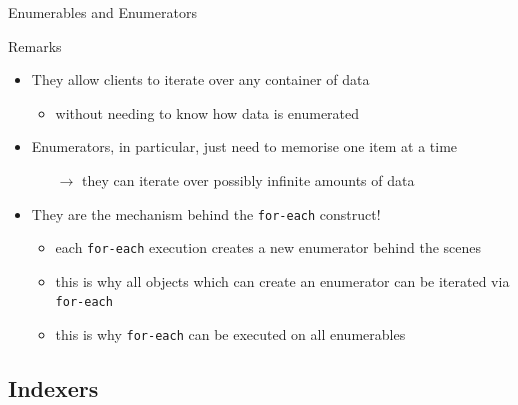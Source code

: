 \documentclass[presentation]{beamer}
\begin{document}
\begin{frame}{Enumerables and Enumerators}
  \begin{exampleblock}{Remarks}
    \begin{itemize}
      \item They allow clients to iterate over any container of data
      \begin{itemize}
        \item without needing to know \alert{how} data is enumerated
      \end{itemize}
  
      \item Enumerators, in particular, just need to memorise one item at a time
      \begin{itemize}
        \item[$\rightarrow$] they can iterate over \alert{possibly infinite} amounts of data
      \end{itemize}

      \item They are the mechanism behind the \alert{\texttt{for-each}} construct!
      \begin{itemize}
        \item each \texttt{for-each} execution creates a new enumerator behind the scenes
        \item this is why all objects which can create an enumerator can be iterated via \texttt{for-each}
        \item this is why \texttt{for-each} can be executed on all enumerables
      \end{itemize}
    \end{itemize}
  \end{exampleblock}
\end{frame}

\subsection{Indexers}
\end{document}
